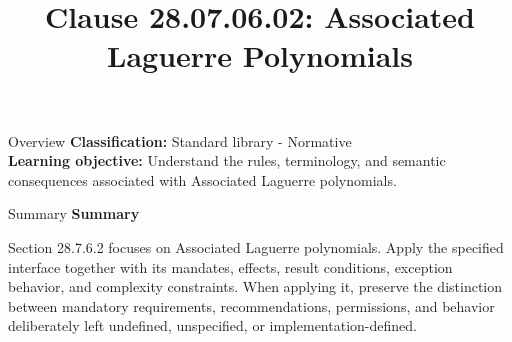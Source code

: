 \documentclass[10pt,letterpaper]{article}
\title{Clause 28.07.06.02: Associated Laguerre Polynomials}
\author{}
\date{}
\begin{document}
\maketitle
\begin{CornellOverviewBox}{Overview}
\textbf{Classification:} Standard library - Normative\\[2pt]
\textbf{Learning objective:} Understand the rules, terminology, and semantic consequences associated with Associated Laguerre polynomials.
\end{CornellOverviewBox}\begin{CornellSummaryBox}{Summary}
{\sffamily\bfseries\color{Accent} Summary}\par\vspace{3pt}Section 28.7.6.2 focuses on Associated Laguerre polynomials. Apply the specified interface together with its mandates, effects, result conditions, exception behavior, and complexity constraints. When applying it, preserve the distinction between mandatory requirements, recommendations, permissions, and behavior deliberately left undefined, unspecified, or implementation-defined.
\end{CornellSummaryBox}
\end{document}
